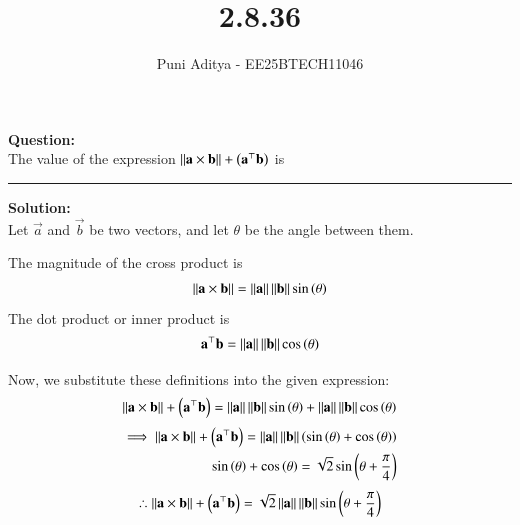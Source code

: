 \documentclass[journal]{IEEEtran}
\begin{document}
\title{2.8.36}
\author{Puni Aditya - EE25BTECH11046}
\maketitle

\textbf{Question:}\\
The value of the expression $\left\lVert\mathbf{a} \times \mathbf{b}\right\rVert + \left(\mathbf{a}^\top\mathbf{b}\right)$ is \rule{2cm}{0.4pt}

\textbf{Solution:}\\
Let $\vec{a}$ and $\vec{b}$ be two vectors, and let $\theta$ be the angle between them.

The magnitude of the cross product is
\begin{align}
    \left\lVert\mathbf{a} \times \mathbf{b}\right\rVert = \left\lVert\mathbf{a}\right\rVert \left\lVert\mathbf{b}\right\rVert \sin\left(\theta\right)
\end{align}
The dot product or inner product is
\begin{align}
    \mathbf{a}^\top\mathbf{b} = \left\lVert\mathbf{a}\right\rVert \left\lVert\mathbf{b}\right\rVert \cos\left(\theta\right)
\end{align}

Now, we substitute these definitions into the given expression:
\begin{align}
    \left\lVert\mathbf{a} \times \mathbf{b}\right\rVert + \left(\mathbf{a}^\top\mathbf{b}\right) = \left\lVert\mathbf{a}\right\rVert \left\lVert\mathbf{b}\right\rVert \sin\left(\theta\right) + \left\lVert\mathbf{a}\right\rVert \left\lVert\mathbf{b}\right\rVert \cos\left(\theta\right) \label{eq:1}
\end{align}
\begin{align}
\implies \left\lVert\mathbf{a} \times \mathbf{b}\right\rVert + \left(\mathbf{a}^\top\mathbf{b}\right) = \left\lVert\mathbf{a}\right\rVert \left\lVert\mathbf{b}\right\rVert \left(\sin\left(\theta\right) + \cos\left(\theta\right)\right) \\
\sin\left(\theta\right) + \cos\left(\theta\right) = \sqrt{2}\sin\left(\theta + \frac{\pi}{4}\right)
\end{align}
\begin{align*}
\therefore \left\lVert\mathbf{a} \times \mathbf{b}\right\rVert + \left(\mathbf{a}^\top\mathbf{b}\right) = \sqrt{2} \left\lVert\mathbf{a}\right\rVert \left\lVert\mathbf{b}\right\rVert \sin\left(\theta + \frac{\pi}{4}\right)
\end{align*}
\end{document}
